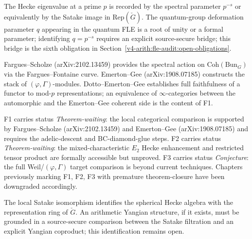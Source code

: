 \begin{remark}
\label{v4-arith:fle-audit:rem:q-vs-ps}
The Hecke eigenvalue at a prime \(p\) is recorded by the spectral
parameter \(p^{-s}\) or equivalently by the Satake image in
\(\mathrm{Rep}(\check G)\). The quantum-group deformation parameter
\(q\) appearing in the quantum FLE is a root of unity or a formal
parameter; identifying \(q = p^{-s}\) requires an explicit source-secure
bridge; this bridge is the sixth obligation in
Section~\ref{v4-arith:fle-audit:open-obligations}.
\end{remark}

\begin{remark}
\label{v4-arith:fle-audit:rem:fs-eg-deg}
Fargues--Scholze (arXiv:2102.13459) provides the spectral action on
\(\mathrm{Coh}(\mathrm{Bun}_{G})\) via the Fargues--Fontaine curve.
Emerton--Gee (arXiv:1908.07185) constructs the stack of
\((\varphi,\Gamma)\)-modules. Dotto--Emerton--Gee establishes full
faithfulness of a functor to mod-\(p\) representations; an
equivalence of \(\infty\)-categories between the automorphic and the
Emerton--Gee coherent side is the content of F1.
\end{remark}

\begin{remark}
\label{v4-arith:fle-audit:rem:f123-status}
F1 carries status \emph{Theorem-waiting}: the local categorical
comparison is supported by Fargues--Scholze (arXiv:2102.13459) and
Emerton--Gee (arXiv:1908.07185) and requires the adelic-descent
and BC-diamond-glue steps. F2 carries status
\emph{Theorem-waiting}: the mixed-characteristic \(E_{2}\) Hecke
enhancement and restricted tensor product are formally accessible but
unproved. F3 carries status \emph{Conjecture}: the full
Weil/\((\varphi,\Gamma)\) target comparison is beyond current
techniques. Chapters previously marking F1, F2, F3 with premature
theorem-closure have been downgraded accordingly.
\end{remark}

\begin{remark}
\label{v4-arith:fle-audit:rem:satake-yangian}
The local Satake isomorphism identifies the spherical Hecke algebra
with the representation ring of \(\check G\). An arithmetic Yangian
structure, if it exists, must be grounded in a source-secure
comparison between the Satake filtration and an explicit Yangian
coproduct; this identification remains open.
\end{remark}


